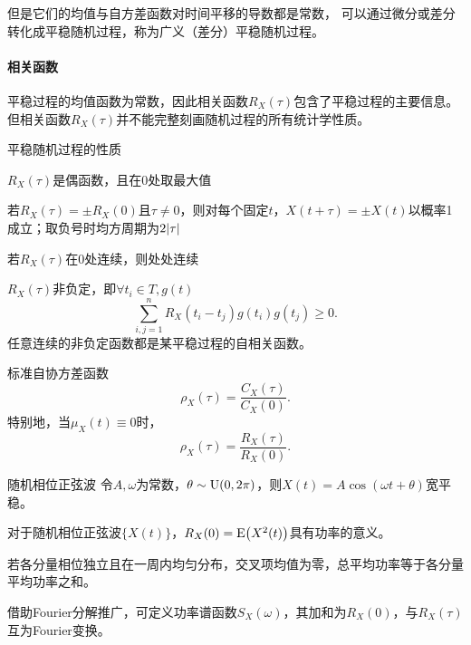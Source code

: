 但是它们的均值与自方差函数对时间平移的导数都是常数，
可以通过微分或差分转化成平稳随机过程，称为广义（差分）平稳随机过程。
\paragraph{相关函数}
平稳过程的均值函数为常数，因此相关函数$R_X(\tau)$包含了平稳过程的主要信息。但相关函数$R_X(\tau)$并不能完整刻画随机过程的所有统计学性质。
\begin{theorem}{平稳随机过程的性质}{}
	\begin{compactitem}
		\item $R_X(\tau)$是偶函数，且在0处取最大值
		\item 若$R_X(\tau) = \pm R_X(0)$且$\tau \ne 0$，则对每个固定$t$，$X(t + \tau) = \pm X(t)$以概率1成立；取负号时均方周期为$2\lvert\tau\rvert$
		\item 若$R_X(\tau)$在0处连续，则处处连续
		\item $R_X(\tau)$非负定，即$\forall t_i \in T,g(t)$
		\begin{equation}\label{eq:ps-positive-semidefinite-correlation}
			\sum_{i,j=1}^nR_X(t_i - t_j)g(t_i)g(t_j) \geqslant 0.
		\end{equation}
		任意连续的非负定函数都是某平稳过程的自相关函数。
	\end{compactitem}
\end{theorem}
标准自协方差函数
\begin{equation}\label{eq:ps-normalized-autocovariance}
	\rho_X(\tau) = \frac{C_X(\tau)}{C_X(0)}.
\end{equation}
特别地，当$\mu_X(t) \equiv 0$时，
\[
	\rho_X(\tau) = \frac{R_X(\tau)}{R_X(0)}.
\]
\begin{example}{随机相位正弦波}{}
	令$A,\omega$为常数，$\theta \sim \operatorname{U}(0,2\pi)$，则$X(t) = A\cos(\omega t + \theta)$宽平稳。
\end{example}
对于随机相位正弦波$\{X(t)\}$，$R_X(0) = \operatorname{E}\bigl(X^2(t)\bigr)$具有功率的意义。
\begin{compactitem}
	\item 若各分量相位独立且在一周内均匀分布，交叉项均值为零，总平均功率等于各分量平均功率之和。
	\item 借助Fourier分解推广，可定义功率谱函数$S_X(\omega)$，其加和为$R_X(0)$，与$R_X(\tau)$互为Fourier变换。
\end{compactitem}

